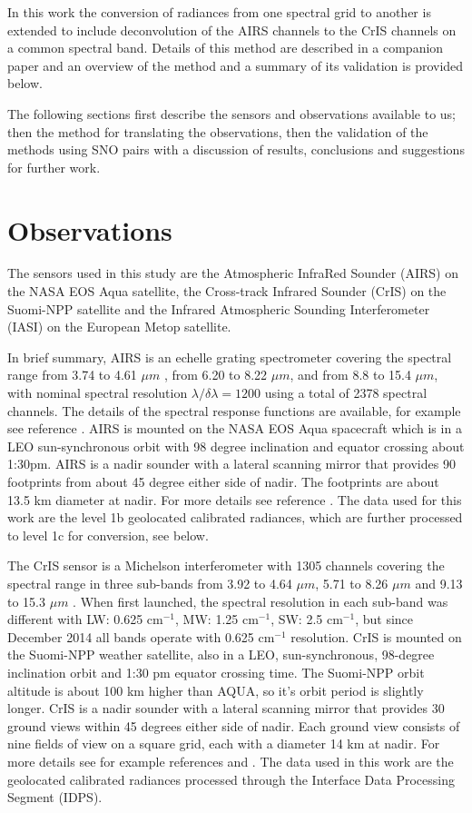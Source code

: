 \documentclass[twocolumn,10pt]{article}
\begin{document}
In this work the conversion of radiances from one spectral grid to another is extended to include deconvolution of the AIRS channels to the CrIS channels on a common spectral band. Details of this method are described in a companion paper \cite{Motteler2017a} and an overview of the method and a summary of its validation is provided below. 

The following sections first describe the sensors and observations available to us; then the method for translating the observations, then the validation of the methods using SNO pairs with a discussion of results, conclusions and suggestions for further work.

\section{Observations}
\label{sec:orgheadline3}

The sensors used in this study are the Atmospheric InfraRed Sounder (AIRS) on the NASA EOS Aqua satellite, the Cross-track Infrared Sounder (CrIS) on the Suomi-NPP satellite and the Infrared Atmospheric Sounding Interferometer (IASI) on the European Metop satellite.

In brief summary, AIRS is an echelle grating spectrometer covering the spectral range from 3.74 to 4.61 $\mu m$ , from 6.20 to 8.22 $\mu m$, and from 8.8 to 15.4 $\mu m$, with nominal spectral resolution $\lambda/\delta\lambda= 1200$ using a total of 2378 spectral channels. The details of the spectral response functions are available, for example see reference \cite{airscalib}. AIRS is mounted on the NASA EOS Aqua spacecraft which is in a LEO sun-synchronous orbit with 98 degree inclination and equator crossing about 1:30pm. AIRS is a nadir sounder with a lateral scanning mirror that provides 90 footprints from about 45 degree either side of nadir. The footprints are about 13.5 km diameter at nadir. For more details see reference \cite{airseos}. The data used for this work are the level 1b geolocated calibrated radiances, which are further processed to level 1c for conversion, see below.

The CrIS sensor is a Michelson interferometer with 1305 channels covering the spectral range in three sub-bands from 3.92 to 4.64 $\mu m$, 5.71 to 8.26 $\mu m$ and 9.13 to 15.3 $\mu m$ . When first launched, the spectral resolution in each sub-band was different with LW: 0.625 cm$^{-1}$, MW: 1.25 cm$^{-1}$, SW: 2.5 cm$^{-1}$, but since December 2014 all bands operate with 0.625 cm$^{-1}$ resolution. CrIS is mounted on the Suomi-NPP weather satellite, also in a LEO, sun-synchronous, 98-degree inclination orbit and 1:30 pm equator crossing time. The Suomi-NPP orbit altitude is about 100 km higher than AQUA, so it's orbit period is slightly longer. CrIS is a nadir sounder with a lateral scanning mirror that provides 30 ground views within 45 degrees either side of nadir. Each ground view consists of nine fields of view on a square grid, each with a diameter 14 km at nadir. For more details see for example references \cite{crisweb} and \cite{criscal}. The data used in this work are the geolocated calibrated radiances processed through the Interface Data Processing Segment (IDPS).
\end{document}
